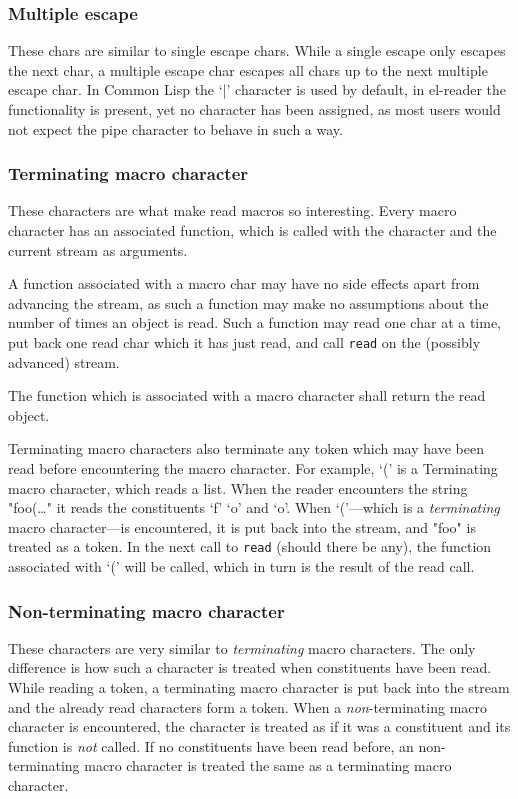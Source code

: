 \documentclass[a4paper]{article}
\newcommand{\cl}{Common Lisp}
\newcommand{\elr}{el-reader}
\newcommand{\fun}[1]{\texttt{#1}}
\begin{document}
\subsubsection{Multiple escape}
\label{par:multiple-escape}

These chars are similar to single escape chars.  While a single escape only
escapes the next char, a multiple escape char escapes all chars up to the next
multiple escape char.  In \cl{} the `|' character is used by default, in
\elr{} the functionality is present, yet no character has been assigned, as
most users would not expect the pipe character to behave in such a way.

\subsubsection{Terminating macro character}
\label{par:terminating-macro-char}

These characters are what make read macros so interesting.  Every macro
character has an associated function, which is called with the character and the
current stream as arguments.

A function associated with a macro char may have no side effects apart from
advancing the stream, as such a function may make no assumptions about the
number of times an object is read.  Such a function may read one char at a time,
put back one read char which it has just read, and call \fun{read} on the
(possibly advanced) stream.

The function which is associated with a macro character shall return the read
object.

Terminating macro characters also terminate any token which may have been read
before encountering the macro character.  For example, `(' is a Terminating
macro character, which reads a list.  When the reader encounters the string
"foo(\ldots{}" it reads the constituents `f' `o' and `o'.  When `('---which is a
\emph{terminating} macro character---is encountered, it is put back into the
stream, and "foo" is treated as a token.  In the next call to \fun{read} (should
there be any), the function associated with `(' will be called, which in turn is
the result of the read call.

\subsubsection{Non-terminating macro character}
\label{subsubsec:non-terminating-macro-char}

These characters are very similar to \emph{terminating} macro characters.  The
only difference is how such a character is treated when constituents have been
read.  While reading a token, a terminating macro character is put back into the
stream and the already read characters form a token.  When a
\emph{non}-terminating macro character is encountered, the character is treated
as if it was a constituent and its function is \emph{not} called.  If no
constituents have been read before, an non-terminating macro character is
treated the same as a terminating macro character.
\end{document}
